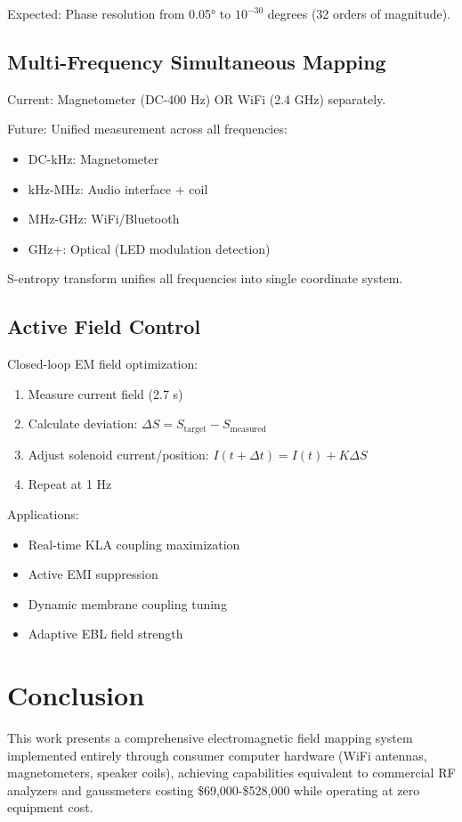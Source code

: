 \documentclass[12pt,a4paper]{article}
\begin{document}
Expected: Phase resolution from 0.05° to $10^{-30}$ degrees (32 orders of magnitude).

\subsection{Multi-Frequency Simultaneous Mapping}

Current: Magnetometer (DC-400 Hz) OR WiFi (2.4 GHz) separately.

Future: Unified measurement across all frequencies:
\begin{itemize}
\item DC-kHz: Magnetometer
\item kHz-MHz: Audio interface + coil
\item MHz-GHz: WiFi/Bluetooth
\item GHz+: Optical (LED modulation detection)
\end{itemize}

S-entropy transform unifies all frequencies into single coordinate system.

\subsection{Active Field Control}

Closed-loop EM field optimization:
\begin{enumerate}
\item Measure current field (2.7 s)
\item Calculate deviation: $\Delta S = S_{\text{target}} - S_{\text{measured}}$
\item Adjust solenoid current/position: $I(t+\Delta t) = I(t) + K \Delta S$
\item Repeat at 1 Hz
\end{enumerate}

Applications:
\begin{itemize}
\item Real-time KLA coupling maximization
\item Active EMI suppression
\item Dynamic membrane coupling tuning
\item Adaptive EBL field strength
\end{itemize}

\section{Conclusion}

This work presents a comprehensive electromagnetic field mapping system implemented entirely through consumer computer hardware (WiFi antennas, magnetometers, speaker coils), achieving capabilities equivalent to commercial RF analyzers and gaussmeters costing \$69,000-\$528,000 while operating at zero equipment cost.
\end{document}
